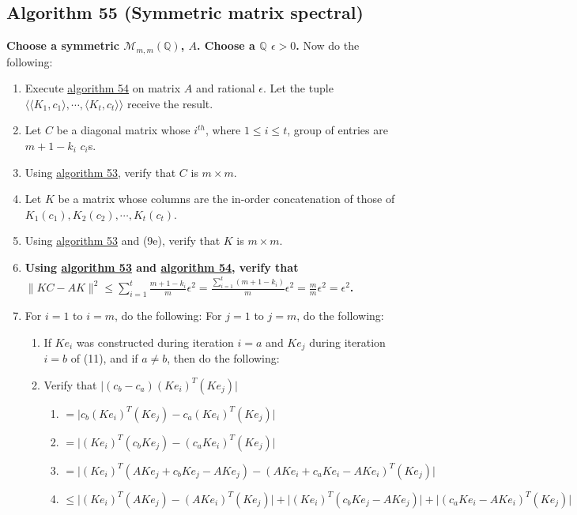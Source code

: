 \documentclass[twocolumn]{article}
\begin{document}
		\subsection{Algorithm 55 (Symmetric matrix spectral)}\label{sec:algorithm 55}
			\textbf{Choose a symmetric $\mathcal{M}_{m,m}(\mathbb{Q})$, $A$. Choose a $\mathbb{Q}$ $\epsilon>0$.} Now do the following:
			\begin{enumerate}
				\item Execute \hyperref[sec:algorithm 54]{algorithm 54} on matrix $A$ and rational $\epsilon$. Let the tuple $\langle\langle K_1,c_1\rangle,\cdots,\langle K_t,c_t\rangle\rangle$ receive the result.
				\item Let $C$ be a diagonal matrix whose $i^{th}$, where $1\le i\le t$, group of entries are $m+1-k_i$ $c_i$s.
				\item Using \hyperref[sec:algorithm 53]{algorithm 53}, verify that $C$ is $m\times m$.
				\item Let $K$ be a matrix whose columns are the in-order concatenation of those of $K_1(c_1),K_2(c_2),\cdots,K_t(c_t)$.
				\item Using \hyperref[sec:algorithm 53]{algorithm 53} and (9e), verify that $K$ is $m\times m$.
				\item \textbf{Using \hyperref[sec:algorithm 53]{algorithm 53} and \hyperref[sec:algorithm 54]{algorithm 54}, verify that $\lVert KC-AK\rVert^2\le\sum_{i=1}^t\frac{m+1-k_i}{m}\epsilon^2=\frac{\sum_{i=1}^t (m+1-k_i)}{m}\epsilon^2=\frac{m}{m}\epsilon^2=\epsilon^2$.}
				\item For $i=1$ to $i=m$, do the following: For $j=1$ to $j=m$, do the following:
				\begin{enumerate}
					\item If $Ke_i$ was constructed during iteration $i=a$ and $Ke_j$ during iteration $i=b$ of (11), and if $a\ne b$, then do the following:
					\item Verify that $\lvert(c_b-c_a)(Ke_i)^T(Ke_j)\rvert$
					\begin{enumerate}
						\item $=\lvert c_b(Ke_i)^T(Ke_j)-c_a(Ke_i)^T(Ke_j)\rvert$
						\item $=\lvert(Ke_i)^T(c_bKe_j)-(c_aKe_i)^T(Ke_j)\rvert$
						\item $=\lvert(Ke_i)^T(AKe_j+c_bKe_j-AKe_j)-(AKe_i+c_aKe_i-AKe_i)^T(Ke_j)\rvert$
						\item $\le\lvert(Ke_i)^T(AKe_j)-(AKe_i)^T(Ke_j)\rvert+\lvert(Ke_i)^T(c_bKe_j-AKe_j)\rvert+\lvert(c_aKe_i-AKe_i)^T(Ke_j)\rvert$

\end{enumerate}
\end{enumerate}
\end{enumerate}
\end{document}
